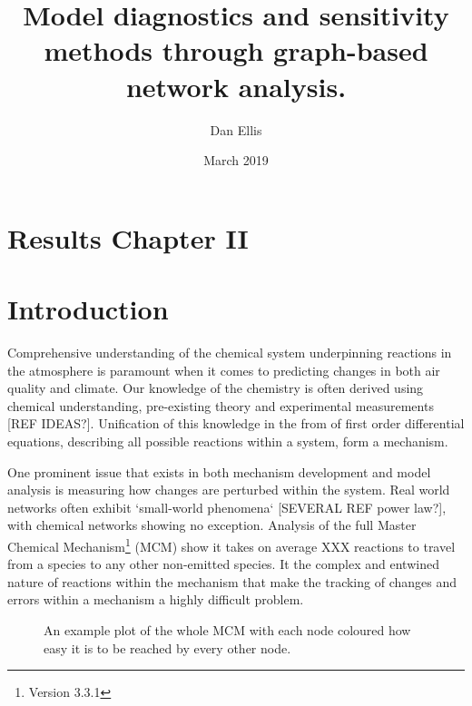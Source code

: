 \documentclass[twoside,reqno]{article}
\title{Model diagnostics and sensitivity methods through graph-based network analysis.}
\author{Dan Ellis }
\date{March 2019}
\def\blankpage{%
      \clearpage%
      \thispagestyle{empty}%
      \addtocounter{page}{-1}%
      \null%
      \clearpage}
\begin{document}
\maketitle

\restoregeometry
\blankpage
\doublespacing
\newpage
\section*{Results Chapter II}
\tableofcontents
\newpage

\raggedbottom %
\section{Introduction}
Comprehensive understanding of the chemical system underpinning reactions in the atmosphere is paramount when it comes to predicting changes in both air quality and climate. Our knowledge of the chemistry is often derived using chemical understanding, pre-existing theory and experimental measurements [REF IDEAS?]. Unification of this knowledge in the from of first order differential equations, describing all possible reactions within a system, form a mechanism.





One prominent issue that exists in both mechanism development and model analysis is measuring how changes are perturbed within the system. Real world networks often exhibit `small-world phenomena` [SEVERAL REF power law?], with chemical networks showing no exception. Analysis of the full Master Chemical Mechanism\footnote{Version 3.3.1} (MCM) show it takes on average XXX reactions to travel from a species to any other non-emitted species. It the complex and entwined nature of reactions within the mechanism that make the tracking of changes and errors within a mechanism a highly difficult problem.


\begin{figure}[H]
    \centering
    \caption{An example plot of the whole MCM with each node coloured how easy it is to be reached by every other node. }
    \label{fig:smallworld}
\end{figure}
\end{document}
